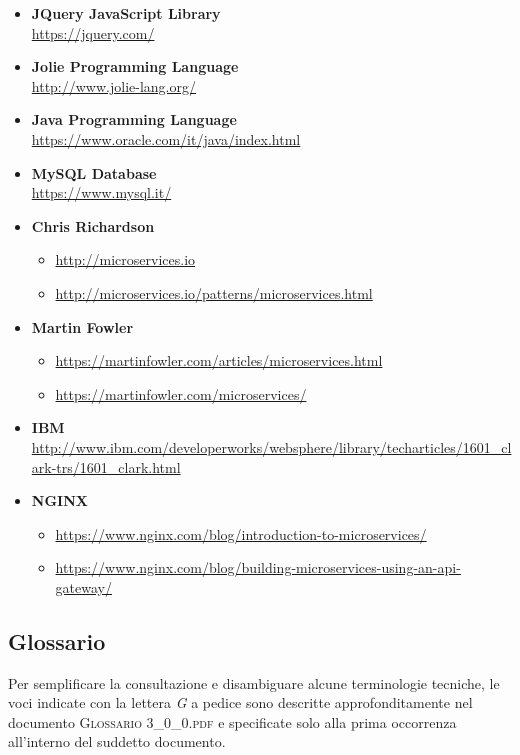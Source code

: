\begin{itemize}
	\item \textbf{JQuery JavaScript Library}\\
	\url{https://jquery.com/}
	\item \textbf{Jolie Programming Language}\\
	\url{http://www.jolie-lang.org/}
	\item \textbf{Java Programming Language}\\
	\url{https://www.oracle.com/it/java/index.html}
	\item \textbf{MySQL Database}\\
	\url{https://www.mysql.it/}
	\item \textbf{Chris Richardson}
	\begin{itemize}
		\item \url{http://microservices.io}
		\item \url{http://microservices.io/patterns/microservices.html}
	\end{itemize}
	\item \textbf{Martin Fowler}
	\begin{itemize}
		\item \url{https://martinfowler.com/articles/microservices.html}
		\item \url{https://martinfowler.com/microservices/}
	\end{itemize}
	\item \textbf{IBM}\\
	\url{http://www.ibm.com/developerworks/websphere/library/techarticles/1601_clark-trs/1601_clark.html}
	\item \textbf{NGINX}
	\begin{itemize}
		\item \url{https://www.nginx.com/blog/introduction-to-microservices/}
		\item \url{https://www.nginx.com/blog/building-microservices-using-an-api-gateway/}
	\end{itemize}
\end{itemize}

\subsection{Glossario}
Per semplificare la consultazione e disambiguare alcune terminologie tecniche, le voci indicate con la lettera \textit{G} a pedice sono descritte approfonditamente nel documento \textsc{Glossario 3\_0\_0.pdf} e specificate solo alla prima occorrenza all'interno del suddetto documento.